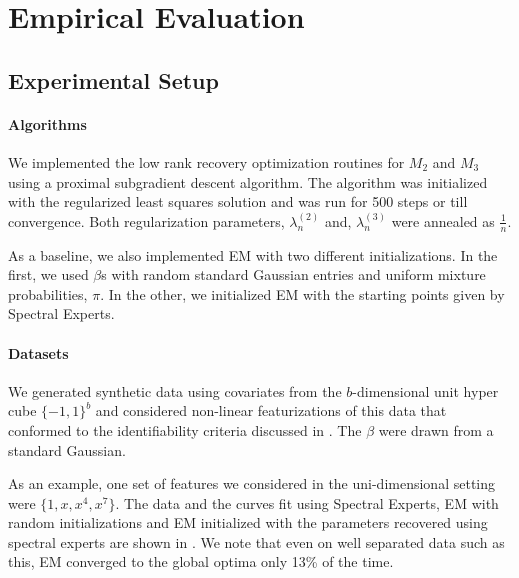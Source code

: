 \section{Empirical Evaluation}
\label{sec:evaluation}

\subsection{Experimental Setup}

\paragraph{Algorithms}

We implemented the low rank recovery optimization routines for $M_2$ and
$M_3$ using a proximal subgradient descent
algorithm.%
The algorithm
was initialized with the regularized least squares solution and was run
for 500 steps or till convergence. Both regularization parameters,
$\lambda_n^{(2)}$ and, $\lambda_n^{(3)}$ were annealed as $\frac{1}{n}$. 

As a baseline, we also implemented EM with two different
initializations. In the first, we used $\beta$s with random standard
Gaussian entries and uniform mixture probabilities, $\pi$. In the other,
we initialized EM with the starting points given by Spectral Experts. 

\paragraph{Datasets}

We generated synthetic data using covariates from the $b$-dimensional
unit hyper cube $\{-1,1\}^b$ and considered non-linear featurizations of
this data that conformed to the identifiability criteria discussed in
. The $\beta$ were drawn from a standard Gaussian.  

As an example, one set of features we considered in the uni-dimensional
setting were $\{1, x, x^4, x^7\}$. The data and the curves fit using
Spectral Experts, EM with random initializations and EM initialized with
the parameters recovered using spectral experts are shown in
. We note that even on well separated data such as
this, EM converged to the global optima only 13\% of the time.

